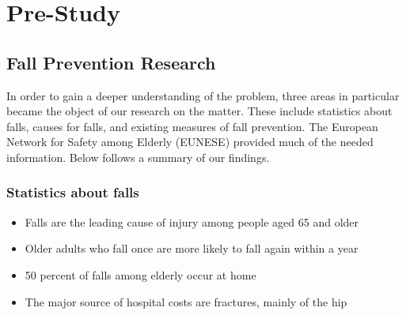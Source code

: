 \chapter{Pre-Study}
\section{Fall Prevention Research}

In order to gain a deeper understanding of the problem, three areas in particular became the object of our research on the matter. These include statistics about falls, causes for falls, and existing measures of fall prevention. The European Network for Safety among Elderly (EUNESE) provided much of the needed information. Below follows a summary of our findings. 

\subsection*{Statistics about falls}
\begin{itemize}
  \item Falls are the leading cause of injury among people aged 65 and older \cite{facts}
  \item Older adults who fall once are more likely to fall again within a year\cite{conference}
  \item 50 percent of falls among elderly occur at home\cite{cerepri}
  \item The major source of hospital costs are fractures, mainly of the hip \cite{Polinder}
\end{itemize}

